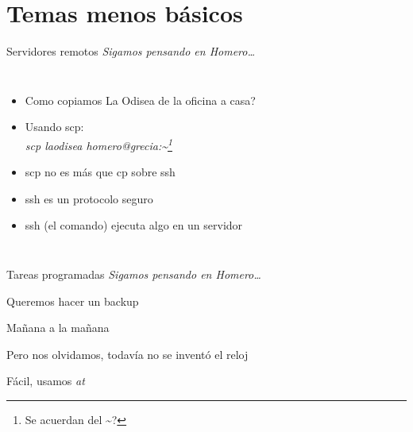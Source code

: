 \section{Temas menos b\'asicos}


\begin{frame}[t]{Servidores remotos}
\textit{ Sigamos pensando en Homero\ldots }
\bigskip
\begin{columns}[onlytextwidth]
	\begin{itemize}
		\item Como copiamos La Odisea de la oficina a casa?
		\item Usando scp: \\ \textit{ scp laodisea homero@grecia:\textasciitilde \footnote[1]{Se acuerdan del \textasciitilde?} }
		\item scp no es m\'as que cp sobre ssh
		\item ssh es un protocolo seguro
		\item ssh (el comando) ejecuta algo en un servidor
	\end{itemize}
\end{columns}
\end{frame}


\begin{frame}[t]{Tareas programadas}
\textit{ Sigamos pensando en Homero\ldots }
\begin{itemize}
	\item Queremos hacer un backup
	\item Ma\~nana a la ma\~nana
	\item Pero nos olvidamos, todav\'ia no se invent\'o el reloj
	\only<1> {
		\begin{center}
		\bigskip
		\end{center}
	} {
		\item F\'acil, usamos \textit{ at }
		\bigskip
		
	}
\end{itemize}
\end{frame}


